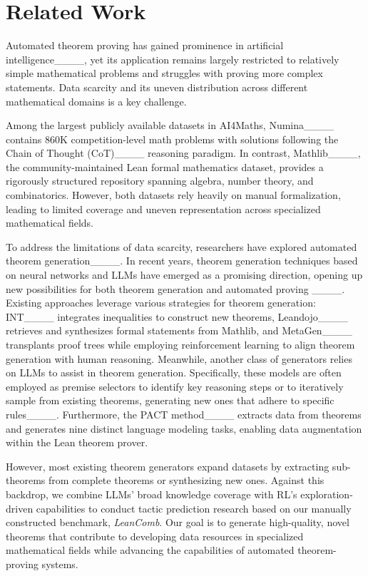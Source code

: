\section{Related Work}
Automated theorem proving has gained prominence in artificial intelligence____, yet its application remains largely restricted to relatively simple mathematical problems and struggles with proving more complex statements. Data scarcity and its uneven distribution across different mathematical domains is a key challenge.


Among the largest publicly available datasets in AI4Maths, Numina____ contains 860K competition-level math problems with solutions following the Chain of Thought (CoT)____ reasoning paradigm. In contrast, Mathlib____, the community-maintained Lean formal mathematics dataset, provides a rigorously structured repository spanning algebra, number theory, and combinatorics. However, both datasets rely heavily on manual formalization, leading to limited coverage and uneven representation across specialized mathematical fields.

To address the limitations of data scarcity, researchers have explored automated theorem generation____. In recent years, theorem generation  techniques based on neural networks and LLMs have emerged as a promising direction, opening up new possibilities for both theorem generation and automated proving ____.
Existing approaches leverage various strategies for theorem generation: INT____ integrates inequalities to construct new theorems, Leandojo____ retrieves and synthesizes formal statements from Mathlib, and MetaGen____ transplants proof trees while employing reinforcement learning to align theorem generation with human reasoning. Meanwhile, another class of generators relies on LLMs to assist in theorem generation. Specifically, these models are often employed as premise selectors to identify key reasoning steps or to iteratively sample from existing theorems, generating new ones that adhere to specific rules____. Furthermore, the PACT method____ extracts data from theorems and generates nine distinct language modeling tasks, enabling data augmentation within the Lean theorem prover.  
 

However, most existing theorem generators expand datasets by extracting sub-theorems from complete theorems or synthesizing new ones. Against this backdrop, we combine
LLMs’ broad knowledge coverage with RL’s exploration-driven capabilities to conduct tactic prediction research based on our manually constructed benchmark, \textit{LeanComb}.
Our goal is to generate high-quality, novel theorems that contribute to developing data resources in specialized mathematical fields while advancing the capabilities of automated theorem-proving systems.